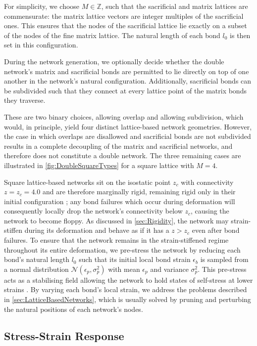 \documentclass[asymmetricmargins]{library/duthesis}%
\begin{document}
\begin{subappendices}
For simplicity, we choose $M\in\mathbb{Z}$, such that the sacrificial and matrix lattices are commensurate: the matrix lattice vectors are integer multiples of the sacrificial ones. This ensures that the nodes of the sacrificial lattice lie exactly on a subset of the nodes of the fine matrix lattice. The natural length of each bond $l_0$ is then set in this configuration. 

During the network generation, we optionally decide whether the double network's matrix and sacrificial bonds are permitted to lie directly on top of one another in the network’s natural configuration. Additionally, sacrificial bonds can be subdivided such that they connect at every lattice point of the matrix bonds they traverse.

These are two binary choices, allowing overlap and allowing subdivision, which would, in principle, yield four distinct lattice-based network geometries. However, the case in which overlaps are disallowed and sacrificial bonds are not subdivided results in a complete decoupling of the matrix and sacrificial networks, and therefore does not constitute a double network. The three remaining cases are illustrated in \cref{fig:DoubleSquareTypes} for a square lattice with $M=4$.

Square lattice-based networks sit on the isostatic point $z_c$ with connectivity $z=z_c=4.0$ and are therefore marginally rigid, remaining rigid only in their initial configuration \cite{Head_marginally_rigid_2022}; any bond failures which occur during deformation will consequently locally drop the network's connectivity below $z_c$, causing the network to become floppy. As discussed in \cref{sec:Rigidity}, the network may strain-stiffen during its deformation and behave as if it has a $z > z_c$ even after bond failures. To ensure that the network remains in the strain-stiffened regime throughout its entire deformation, we pre-stress the network by reducing each bond's natural length $l_0$ such that its initial local bond strain $\epsilon_{b}$ is sampled from a normal distribution $\mathcal{N}(\epsilon_p, \sigma_p^2)$ with mean $\epsilon_p$ and variance $\sigma_p^2$. This pre-stress acts as a stabilising field allowing the network to hold states of self-stress at lower strains \cite{tauber_sharing_2021}. By varying each bond's local strain, we address the problems described in \cref{sec:LatticeBasedNetworks}, which is usually solved by pruning and perturbing the natural positions of each network's nodes. 

\subsection{Stress-Strain Response}


\end{subappendices}
\end{document}
